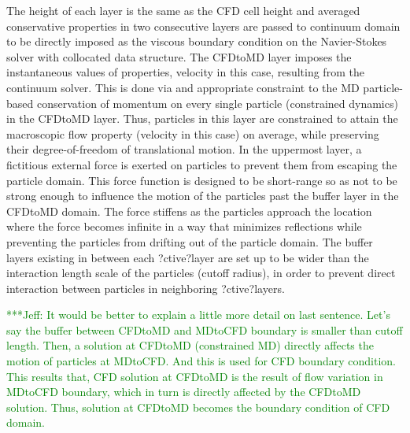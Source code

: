 \documentclass[preprint,12pt]{elsarticle}
\newcommand{\skonote}[1]{ {\textcolor{green} { ***Jeff: #1 }}}
\newcommand{\skonote}[1]{}
\begin{document}
{The height of each layer is the same as the CFD cell height and averaged conservative properties in two consecutive layers are passed to continuum domain to be directly imposed as the viscous boundary condition on the Navier-Stokes solver with collocated data structure. The CFDtoMD layer imposes the instantaneous values of properties, velocity in this case, resulting from the continuum solver. This is done via and appropriate constraint to the MD particle-based conservation of momentum on every single particle (constrained dynamics) in the CFDtoMD layer. Thus, particles in this layer are constrained to attain the macroscopic flow property (velocity in this case) on average, while preserving their degree-of-freedom of translational motion. In the uppermost layer, a fictitious external force is exerted on particles to prevent them from escaping the particle domain. This force function is designed to be short-range so as not to be strong enough to influence the motion of the particles past the buffer layer in the CFDtoMD domain. The force stiffens as the particles approach the location where the force becomes infinite in a way that minimizes reflections while preventing the particles from drifting out of the particle domain. The buffer layers existing in between each ?ctive?layer are set up to be wider than the interaction length scale of the particles (cutoff radius), in order to prevent direct interaction between particles in neighboring ?ctive?layers.
\\}

\skonote{It would be better to explain a little more detail on last sentence. Let's say the buffer between CFDtoMD and MDtoCFD boundary is smaller than cutoff length. Then, a solution at CFDtoMD (constrained MD) directly affects the motion of particles at MDtoCFD. And this is used for CFD boundary condition. This results that, CFD solution at CFDtoMD is the result of flow variation in MDtoCFD boundary, which in turn is directly affected by the CFDtoMD solution. Thus, solution at CFDtoMD becomes the boundary condition of CFD domain.}
\end{document}
